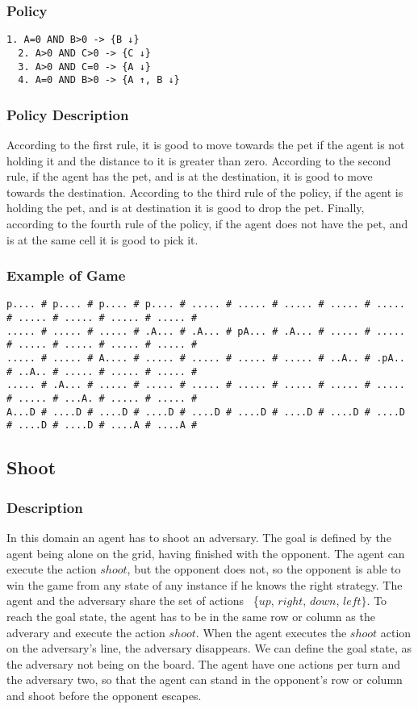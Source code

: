 \documentclass[a4paper]{article}
\begin{document}
\subsubsection{Policy}
\begin{Verbatim}[fontsize=\footnotesize]
  1. A=0 AND B>0 -> {B ↓}
  2. A>0 AND C>0 -> {C ↓}
  3. A>0 AND C=0 -> {A ↓}
  4. A=0 AND B>0 -> {A ↑, B ↓}
\end{Verbatim}

\subsubsection{Policy Description}
According to the first rule, it is good to move towards the pet if the agent is not holding it and the distance to it is greater than zero. According to the second rule, if the agent has the pet, and is at the destination, it is good to move towards the destination. According to the third rule of the policy, if the agent is holding the pet, and is at destination it is good to drop the pet. Finally, according to the fourth rule of the policy, if the agent does not have the pet, and is at the same cell it is good to pick it.

\subsubsection{Example of Game}
\begin{Verbatim}[fontsize=\footnotesize]
p.... # p.... # p.... # p.... # ..... # ..... # ..... # ..... # ..... # ..... # ..... # ..... # ..... #
..... # ..... # ..... # .A... # .A... # pA... # .A... # ..... # ..... # ..... # ..... # ..... # ..... #
..... # ..... # A.... # ..... # ..... # ..... # ..... # ..A.. # .pA.. # ..A.. # ..... # ..... # ..... #
..... # .A... # ..... # ..... # ..... # ..... # ..... # ..... # ..... # ..... # ...A. # ..... # ..... #
A...D # ....D # ....D # ....D # ....D # ....D # ....D # ....D # ....D # ....D # ....D # ....A # ....A #
\end{Verbatim}

\subsection{Shoot}
\subsubsection{Description}
In this domain an agent has to shoot an adversary. The goal is defined by the agent being alone on the grid, having finished with the opponent. The agent can execute the action $shoot$, but the opponent does not, so the opponent is able to win the game from any state of any instance if he knows the right strategy. The agent and the adversary share the set of actions ~\{$up$, $right$, $down$, $left\}$. To reach the goal state, the agent has to be in the same row or column as the adverary and execute the action $shoot$. When the agent executes the $shoot$ action on the adversary's line, the adversary disappears. We can define the goal state, as the adversary not being on the board. The agent have one actions per turn and the adversary two, so that the agent can stand in the opponent's row or column and shoot before the opponent escapes.
\end{document}
